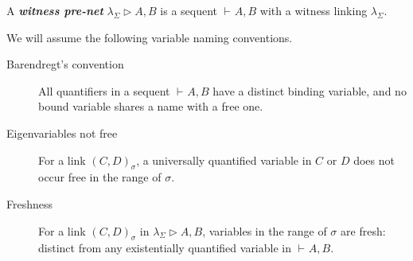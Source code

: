 \documentclass[UKenglish]{lipics-v2016}
\makeatletter
\theoremstyle{plain}
\newcommand\defn[1]{\textit{\textbf{#1}}}
\newcommand\+{+}
\renewcommand\*{\times}
\newcommand\dual[1]{\overline{#1}}
\newcommand\seq[3][]{{\vdash_{#1}}#2,#3}
\newcommand\prf[3]{#1\vdash\!#2,#3}
\newcommand\Seq{\vphantom(\seq}
\newcommand\Prf[3]{\deduce{\Seq{#2}{#3}}{\vphantom(#1}}
\newcommand\net[3]{#1\triangleright #2,#3}
\newcommand\deseq[4][\sigma]{[#2]_{#1}^{#3,#4}}
\newcommand\Deseq[4][\sigma]{\left[\vcenter{#2}\right]_{#1}^{#3\,,\,#4}}
\newcommand\link[3][\sigma]{(#2,#3)_{#1}}
\newcommand\Qrr{\!\!\scriptstyle\qrr}
\newcommand\qrr[1]{
  \ifx#1+\expandafter\@qrr\else
  \ifx#1*\*\mathrm R\else
  \ifx#1!\forall\mathrm R\else
  \ifx#1?\expandafter\@@qrr\else
  \ifx#11\mathrm{ax}\else
  #1\mathrm R
  \fi\fi\fi\fi\fi
}
\newcommand\@qrr[1]{+\mathrm R,#1}
\newcommand\@@qrr[1]{\exists\mathrm R,#1}
\makeatother
\begin{document}
\begin{definition}
A \defn{witness pre-net} $\net{\lambda_\Sigma}AB$ is a sequent $\seq AB$ with a witness linking $\lambda_\Sigma$.
\end{definition}

We will assume the following variable naming conventions.
%
\begin{description}
	\item
[Barendregt's convention] All quantifiers in a sequent $\seq AB$ have a distinct binding variable, and no bound variable shares a name with a free one.

	\item[Eigenvariables not free]
For a link $\link CD$, a universally quantified variable in $C$ or $D$ does not occur free in the range of $\sigma$.

	\item[Freshness]
For a link $\link CD$ in $\net{\lambda_\Sigma}AB$, variables in the range of $\sigma$ are fresh: distinct from any existentially quantified variable in $\seq AB$.
\end{description}


\end{document}
